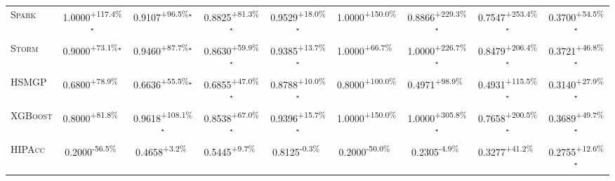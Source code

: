 \begin{table}[htbp]
\begin{tabular}{l|cccc|cccc}
\textsc{Spark} & \cellcolor{green!30}1.0000\textsuperscript{+117.4\%}$^\star$ & \cellcolor{green!30}0.9107\textsuperscript{+96.5\%}$^\star$ & \cellcolor{green!30}0.8825\textsuperscript{+81.3\%}$^\star$ & \cellcolor{green!30}0.9529\textsuperscript{+18.0\%}$^\star$ & \cellcolor{green!30}1.0000\textsuperscript{+150.0\%}$^{\,\,\,}$ & \cellcolor{green!30}0.8866\textsuperscript{+229.3\%}$^\star$ & \cellcolor{green!30}0.7547\textsuperscript{+253.4\%}$^\star$ & \cellcolor{green!30}0.3700\textsuperscript{+54.5\%}$^\star$ \\
\textsc{Storm} & \cellcolor{green!30}0.9000\textsuperscript{+73.1\%}$^\star$ & \cellcolor{green!30}0.9460\textsuperscript{+87.7\%}$^\star$ & \cellcolor{green!30}0.8630\textsuperscript{+59.9\%}$^\star$ & \cellcolor{green!30}0.9385\textsuperscript{+13.7\%}$^\star$ & \cellcolor{green!30}1.0000\textsuperscript{+66.7\%}$^{\,\,\,}$ & \cellcolor{green!30}1.0000\textsuperscript{+226.7\%}$^\star$ & \cellcolor{green!30}0.8479\textsuperscript{+206.4\%}$^\star$ & \cellcolor{green!30}0.3721\textsuperscript{+46.8\%}$^\star$ \\
\textsc{HSMGP} & \cellcolor{green!30}0.6800\textsuperscript{+78.9\%}$^{\,\,\,}$ & \cellcolor{green!30}0.6636\textsuperscript{+55.5\%}$^\star$ & \cellcolor{green!30}0.6855\textsuperscript{+47.0\%}$^\star$ & \cellcolor{green!30}0.8788\textsuperscript{+10.0\%}$^\star$ & \cellcolor{green!30}0.8000\textsuperscript{+100.0\%}$^{\,\,\,}$ & \cellcolor{green!30}0.4971\textsuperscript{+98.9\%}$^{\,\,\,}$ & \cellcolor{green!30}0.4931\textsuperscript{+115.5\%}$^\star$ & \cellcolor{green!30}0.3140\textsuperscript{+27.9\%}$^\star$ \\
\textsc{XGBoost} & \cellcolor{green!30}0.8000\textsuperscript{+81.8\%}$^{\,\,\,}$ & \cellcolor{green!30}0.9618\textsuperscript{+108.1\%}$^\star$ & \cellcolor{green!30}0.8538\textsuperscript{+67.0\%}$^\star$ & \cellcolor{green!30}0.9396\textsuperscript{+15.7\%}$^\star$ & \cellcolor{green!30}1.0000\textsuperscript{+150.0\%}$^{\,\,\,}$ & \cellcolor{green!30}1.0000\textsuperscript{+305.8\%}$^\star$ & \cellcolor{green!30}0.7658\textsuperscript{+200.5\%}$^\star$ & \cellcolor{green!30}0.3689\textsuperscript{+49.7\%}$^\star$ \\
\textsc{HIPAcc} & \cellcolor{red!30}0.2000\textsuperscript{-56.5\%}$^{\,\,\,}$ & \cellcolor{green!30}0.4658\textsuperscript{+3.2\%}$^{\,\,\,}$ & \cellcolor{green!30}0.5445\textsuperscript{+9.7\%}$^{\,\,\,}$ & \cellcolor{red!30}0.8125\textsuperscript{-0.3\%}$^{\,\,\,}$ & \cellcolor{red!30}0.2000\textsuperscript{-50.0\%}$^{\,\,\,}$ & \cellcolor{red!30}0.2305\textsuperscript{-4.9\%}$^{\,\,\,}$ & \cellcolor{green!30}0.3277\textsuperscript{+41.2\%}$^{\,\,\,}$ & \cellcolor{green!30}0.2755\textsuperscript{+12.6\%}$^\star$ \\

\end{tabular}
\end{table}
